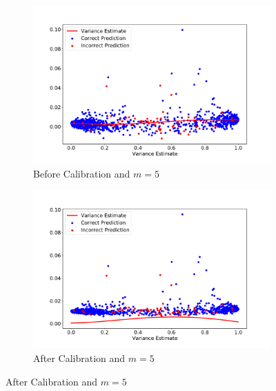 \documentclass[11pt]{article}
\begin{document}
\begin{figure}[htbp]
	\centering
	\begin{subfigure}[b]{0.48\textwidth}
		\centering
		\includegraphics[width=\textwidth]{../figures/BC_Real0.pdf}
		\caption{Before Calibration and $m=5$}
		\label{fig:Before_Calibration_Real}
	\end{subfigure}
	\hfill
	\begin{subfigure}[b]{0.48\textwidth}
		\centering
		\includegraphics[width=\textwidth]{../figures/AC_Real0.pdf}
		\caption{After Calibration and $m=5$}
		\label{fig:Calibration_Real}
	\end{subfigure}
	

\end{figure}
\end{document}
